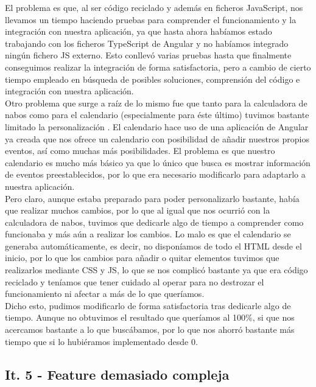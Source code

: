 El problema es que, al ser código reciclado y además en ficheros JavaScript, nos llevamos un tiempo haciendo pruebas para comprender el funcionamiento y la integración con nuestra aplicación, ya que hasta ahora habíamos estado trabajando con los ficheros TypeScript de Angular y no habíamos integrado ningún fichero JS externo. Esto conllevó varias pruebas hasta que finalmente conseguimos realizar la integración de forma satisfactoria, pero a cambio de cierto tiempo empleado en búsqueda de posibles soluciones, comprensión del código e integración con nuestra aplicación.\\

Otro problema que surge a raíz de lo mismo fue que tanto para la calculadora de nabos como para el calendario (especialmente para éste último) tuvimos bastante limitado la personalización \cite{angularcalendar}. El calendario hace uso de una aplicación de Angular ya creada que nos ofrece un calendario con posibilidad de añadir nuestros propios eventos, así como muchas más posibilidades. El problema es que nuestro calendario es mucho más básico ya que lo único que busca es mostrar información de eventos preestablecidos, por lo que era necesario modificarlo para adaptarlo a nuestra aplicación.\\

Pero claro, aunque estaba preparado para poder personalizarlo bastante, había que realizar muchos cambios, por lo que al igual que nos ocurrió con la calculadora de nabos, tuvimos que dedicarle algo de tiempo a comprender como funcionaba y más aún a realizar los cambios. Lo malo es que el calendario se generaba automáticamente, es decir, no disponíamos de todo el HTML desde el inicio, por lo que los cambios para añadir o quitar elementos tuvimos que realizarlos mediante CSS y JS, lo que se nos complicó bastante ya que era código reciclado y teníamos que tener cuidado al operar para no destrozar el funcionamiento ni afectar a más de lo que queríamos.\\

Dicho esto, pudimos modificarlo de forma satisfactoria tras dedicarle algo de tiempo. Aunque no obtuvimos el resultado que queríamos al 100\%, si que nos acercamos bastante a lo que buscábamos, por lo que nos ahorró bastante más tiempo que si lo hubiéramos implementado desde 0.

\subsection{It. 5 - Feature demasiado compleja}

